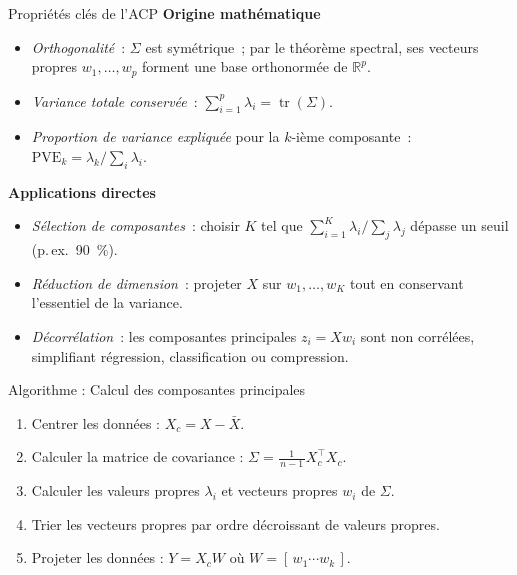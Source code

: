 \documentclass{beamer}
\begin{document}
\begin{frame}{Propriétés clés de l'ACP}
\textbf{Origine mathématique}
\begin{itemize}
  \item \emph{Orthogonalité} : \(\Sigma\) est symétrique ; par le théorème spectral, ses vecteurs propres $w_1,\dots,w_p$ forment une base orthonormée de $\mathbb{R}^{p}$.
  \item \emph{Variance totale conservée} : \(\displaystyle \sum_{i=1}^{p}\lambda_i = \operatorname{tr}(\Sigma)\).
  \item \emph{Proportion de variance expliquée} pour la $k$-ième composante : \(\displaystyle \mathrm{PVE}_k = \lambda_k / \sum_{i}\lambda_i\).
\end{itemize}

\vspace{4pt}
\textbf{Applications directes}
\begin{itemize}
  \item \textit{Sélection de composantes} : choisir $K$ tel que \(\sum_{i=1}^{K}\lambda_i / \sum_{j}\lambda_j\) dépasse un seuil (p. ex. 90 \%).
  \item \textit{Réduction de dimension} : projeter $X$ sur $w_1,\dots,w_K$ tout en conservant l'essentiel de la variance.
  \item \textit{Décorrélation} : les composantes principales $z_i = X w_i$ sont non corrélées, simplifiant régression, classification ou compression.
\end{itemize}
\end{frame}

\begin{frame}{Algorithme : Calcul des composantes principales}
\begin{enumerate}
    \item Centrer les données : $X_{c} = X - \bar X$.
    \item Calculer la matrice de covariance : $\Sigma = \frac{1}{\,n-1\,}X_{c}^\top X_{c}$.
    \item Calculer les valeurs propres $\lambda_i$ et vecteurs propres $w_i$ de $\Sigma$.
    \item Trier les vecteurs propres par ordre décroissant de valeurs propres.
    \item Projeter les données : $Y = X_{c} W$ où $W = [\,w_1 \cdots w_k\,]$.
\end{enumerate}
\end{frame}
\end{document}
